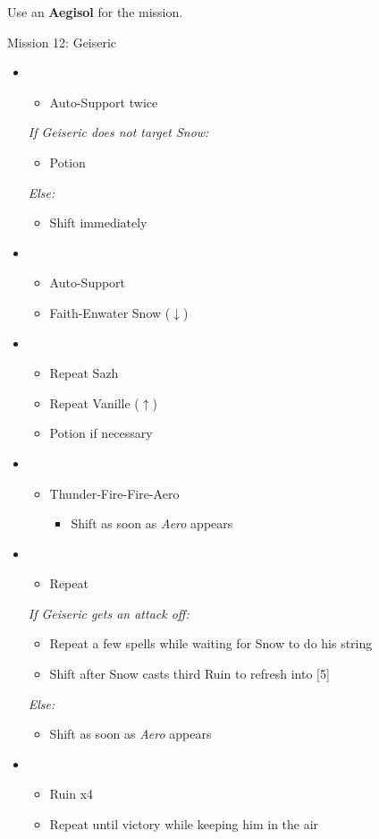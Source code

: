 Use an \textbf{Aegisol} for the mission.
\vfill
\begin{battle}{Mission 12: Geiseric}
	\begin{itemize}
		\item \first
			\begin{itemize}
				\item Auto-Support twice
			\end{itemize}
			\textit{If Geiseric does not target Snow:}
			\begin{itemize}
				\item Potion
			\end{itemize}
			\textit{Else:}
			\begin{itemize}
				\item Shift immediately
			\end{itemize}
		\item \third
			\begin{itemize}
				\item Auto-Support
				\item Faith-Enwater Snow ($\downarrow$)
			\end{itemize}
		\item \fourth
			\begin{itemize}
				\item Repeat Sazh
				\item Repeat Vanille ($\uparrow$)
				\item Potion if necessary
			\end{itemize}
		\item \second
			\begin{itemize}
				\item Thunder-Fire-Fire-Aero
					\begin{itemize}
						\item Shift as soon as \textit{Aero} appears
					\end{itemize}
			\end{itemize}
		\item \sixth
			\begin{itemize}
				\item Repeat
			\end{itemize}
			\textit{If Geiseric gets an attack off:}
			\begin{itemize}
				\item Repeat a few spells while waiting for Snow to do his string
				\item Shift after Snow casts third Ruin to refresh into [5]
			\end{itemize}
			\textit{Else:}
			\begin{itemize}
				\item Shift as soon as \textit{Aero} appears
			\end{itemize}
		\item \fifth
			\begin{itemize}
				\item Ruin x4
				\item Repeat until victory while keeping him in the air
			\end{itemize}
	\end{itemize}
\end{battle}

